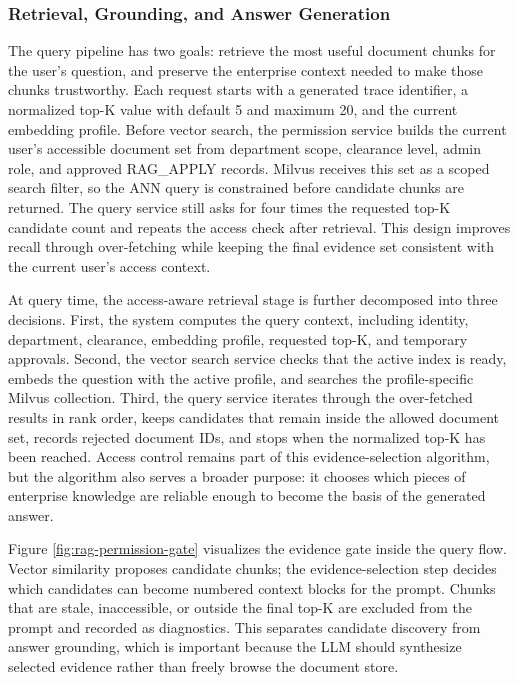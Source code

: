 \subsubsection{Retrieval, Grounding, and Answer Generation}

The query pipeline has two goals: retrieve the most useful document chunks for the user's question, and preserve the enterprise context needed to make those chunks trustworthy. Each request starts with a generated trace identifier, a normalized top-K value with default 5 and maximum 20, and the current embedding profile. Before vector search, the permission service builds the current user's accessible document set from department scope, clearance level, admin role, and approved RAG\_APPLY records. Milvus receives this set as a scoped search filter, so the ANN query is constrained before candidate chunks are returned. The query service still asks for four times the requested top-K candidate count and repeats the access check after retrieval. This design improves recall through over-fetching while keeping the final evidence set consistent with the current user's access context.

At query time, the access-aware retrieval stage is further decomposed into three decisions. First, the system computes the query context, including identity, department, clearance, embedding profile, requested top-K, and temporary approvals. Second, the vector search service checks that the active index is ready, embeds the question with the active profile, and searches the profile-specific Milvus collection. Third, the query service iterates through the over-fetched results in rank order, keeps candidates that remain inside the allowed document set, records rejected document IDs, and stops when the normalized top-K has been reached. Access control remains part of this evidence-selection algorithm, but the algorithm also serves a broader purpose: it chooses which pieces of enterprise knowledge are reliable enough to become the basis of the generated answer.

Figure \ref{fig:rag-permission-gate} visualizes the evidence gate inside the query flow. Vector similarity proposes candidate chunks; the evidence-selection step decides which candidates can become numbered context blocks for the prompt. Chunks that are stale, inaccessible, or outside the final top-K are excluded from the prompt and recorded as diagnostics. This separates candidate discovery from answer grounding, which is important because the LLM should synthesize selected evidence rather than freely browse the document store.


